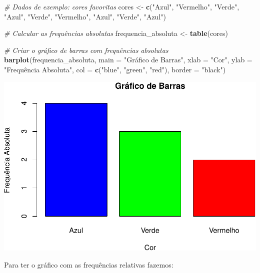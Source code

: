 \documentclass[
]{book}
\newenvironment{Shaded}{\begin{snugshade}}{\end{snugshade}}
\newcommand{\AttributeTok}[1]{\textcolor[rgb]{0.13,0.29,0.53}{#1}}
\newcommand{\CommentTok}[1]{\textcolor[rgb]{0.56,0.35,0.01}{\textit{#1}}}
\newcommand{\FunctionTok}[1]{\textcolor[rgb]{0.13,0.29,0.53}{\textbf{#1}}}
\newcommand{\NormalTok}[1]{#1}
\newcommand{\OtherTok}[1]{\textcolor[rgb]{0.56,0.35,0.01}{#1}}
\newcommand{\StringTok}[1]{\textcolor[rgb]{0.31,0.60,0.02}{#1}}
\begin{document}
\begin{Shaded}
\begin{Highlighting}[]
\CommentTok{\# Dados de exemplo: cores favoritas}
\NormalTok{cores }\OtherTok{\textless{}{-}} \FunctionTok{c}\NormalTok{(}\StringTok{"Azul"}\NormalTok{, }\StringTok{"Vermelho"}\NormalTok{, }\StringTok{"Verde"}\NormalTok{, }\StringTok{"Azul"}\NormalTok{, }\StringTok{"Verde"}\NormalTok{, }
\StringTok{"Vermelho"}\NormalTok{, }\StringTok{"Azul"}\NormalTok{, }\StringTok{"Verde"}\NormalTok{, }\StringTok{"Azul"}\NormalTok{)}

\CommentTok{\# Calcular as frequências absolutas}
\NormalTok{frequencia\_absoluta }\OtherTok{\textless{}{-}} \FunctionTok{table}\NormalTok{(cores)}

\CommentTok{\# Criar o gráfico de barras com frequências absolutas}
\FunctionTok{barplot}\NormalTok{(frequencia\_absoluta,}
  \AttributeTok{main =} \StringTok{"Gráfico de Barras"}\NormalTok{,         }
  \AttributeTok{xlab =} \StringTok{"Cor"}\NormalTok{,         }
  \AttributeTok{ylab =} \StringTok{"Frequência Absoluta"}\NormalTok{,         }
  \AttributeTok{col =} \FunctionTok{c}\NormalTok{(}\StringTok{"blue"}\NormalTok{, }\StringTok{"green"}\NormalTok{, }\StringTok{"red"}\NormalTok{),}
  \AttributeTok{border =} \StringTok{"black"}\NormalTok{) }
\end{Highlighting}
\end{Shaded}

\includegraphics{introR_files/figure-latex/unnamed-chunk-161-1.pdf}

Para ter o gráfico com as frequências relativas fazemos:
\end{document}
